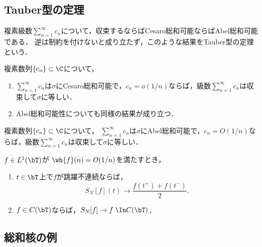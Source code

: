 \documentclass[uplatex,dvipdfmx]{jsreport}
\begin{document}
\subsection{Tauber型の定理}

\begin{tcolorbox}[colframe=ForestGreen, colback=ForestGreen!10!white,breakable,colbacktitle=ForestGreen!40!white,coltitle=black,fonttitle=\bfseries\sffamily,
title=]
    複素級数$\sum_{n=1}^\infty c_n$について，収束するならばCesaro総和可能ならばAbel総和可能である．
    逆は制約を付けないと成り立たず，このような結果をTauber型の定理という．
\end{tcolorbox}

\begin{theorem}
    複素数列$\{c_n\}\subset\C$について，
    \begin{enumerate}
        \item $\sum_{n=1}^\infty c_n$は$\sigma$にCesaro総和可能で，$c_n=o(1/n)$ならば，級数$\sum_{n=1}^\infty c_n$は収束して$\sigma$に等しい．
        \item Abel総和可能性についても同様の結果が成り立つ．
    \end{enumerate}
\end{theorem}

\begin{proposition}[Littlewoodによる精緻化]
    複素数列$\{c_n\}\subset\C$について，
    $\sum_{n=1}^\infty c_n$は$\sigma$にAbel総和可能で，$c_n=O(1/n)$ならば，級数$\sum_{n=1}^\infty c_n$は収束して$\sigma$に等しい．
\end{proposition}

\begin{corollary}\label{cor-speed-of-convergence-and-Fourier-series-convergence}
    $f\in L^1(\bT)$が
    $\wh{f}(n)=O(1/n)$を満たすとき，
    \begin{enumerate}
        \item $t\in\bT$上で$f$が跳躍不連続ならば，
        \[S_N[f](t)\to\frac{f(t^+)+f(t^-)}{2}.\]
        \item $f\in C(\bT)$ならば，$S_N[f]\to f\;\In C(\bT)$．
    \end{enumerate}
\end{corollary}

\subsection{総和核の例}
\end{document}
